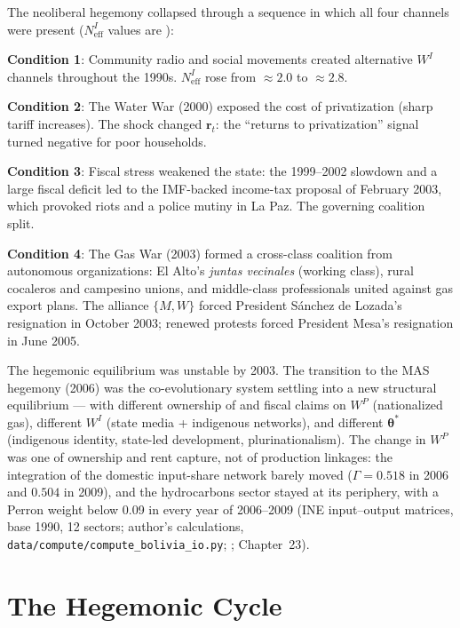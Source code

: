\documentclass[../structural_economics_book.tex]{subfiles}
\begin{document}
\begin{example}\label{ch24:ex:crisis}
The neoliberal hegemony collapsed through a sequence in which all four channels were present ($N_{\text{eff}}^I$ values are \illustrative):

\textbf{Condition 1}: Community radio and social movements created alternative $W^I$ channels throughout the 1990s. $N_{\text{eff}}^I$ rose from $\approx 2.0$ to $\approx 2.8$.

\textbf{Condition 2}: The Water War (2000) exposed the cost of privatization (sharp tariff increases). The shock changed $\mathbf{r}_t$: the ``returns to privatization'' signal turned negative for poor households.

\textbf{Condition 3}: Fiscal stress weakened the state: the 1999--2002 slowdown and a large fiscal deficit led to the IMF-backed income-tax proposal of February 2003, which provoked riots and a police mutiny in La Paz. The governing coalition split.

\textbf{Condition 4}: The Gas War (2003) formed a cross-class coalition from autonomous organizations: El Alto's \textit{juntas vecinales} (working class), rural cocaleros and campesino unions, and middle-class professionals united against gas export plans. The alliance $\{M, W\}$ forced President S\'{a}nchez de Lozada's resignation in October 2003; renewed protests forced President Mesa's resignation in June 2005.

The hegemonic equilibrium was unstable by 2003. The transition to the MAS hegemony (2006) was the co-evolutionary system settling into a new structural equilibrium --- with different ownership of and fiscal claims on $W^P$ (nationalized gas), different $W^I$ (state media + indigenous networks), and different $\boldsymbol{\theta}^*$ (indigenous identity, state-led development, plurinationalism). The change in $W^P$ was one of ownership and rent capture, not of production linkages: the integration of the domestic input-share network barely moved ($\Gamma = 0.518$ in 2006 and $0.504$ in 2009), and the hydrocarbons sector stayed at its periphery, with a Perron weight below 0.09 in every year of 2006--2009 (INE input--output matrices, base 1990, 12 sectors; author's calculations, \texttt{data/compute/compute\_bolivia\_io.py}; \citealp{ine2026sut}; Chapter~23).
\end{example}


\section{The Hegemonic Cycle}
\label{ch24:sec:cycle}
\end{document}
